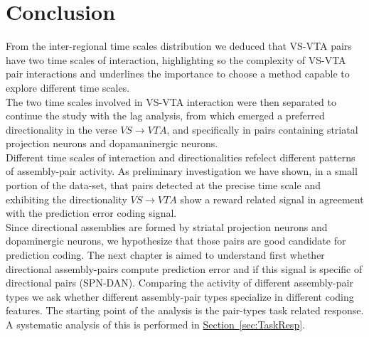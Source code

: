 \section{Conclusion}
From the inter-regional time scales distribution we deduced that VS-VTA pairs have two time scales of interaction, highlighting so the complexity of VS-VTA pair interactions and underlines the importance to choose a method capable to explore different time scales.\\The two time scales involved in VS-VTA interaction were then separated to continue the study with the lag analysis, from which emerged a preferred directionality in the verse $VS\rightarrow VTA$, and specifically in pairs containing striatal projection neurons and dopamaninergic neurons.\\Different time scales of interaction and directionalities refelect different patterns of assembly-pair activity. As preliminary investigation we have shown, in a small portion of the data-set, that pairs detected at the precise time scale and exhibiting the directionality $VS\rightarrow VTA$ show a reward related signal in agreement with the prediction error coding signal.\\Since directional assemblies are formed by striatal projection neurons and dopaminergic neurons, we hypothesize that those pairs are good candidate for prediction coding. The next chapter is aimed to understand first whether directional assembly-pairs compute prediction error and if this signal is specific of directional pairs (SPN-DAN). Comparing the activity of different assembly-pair types we ask whether different assembly-pair types specialize in different coding features. The starting point of the analysis is the pair-types task related response. A systematic analysis of this is performed in \hyperref[sec:TaskResp]{Section~\ref*{sec:TaskResp}}.

